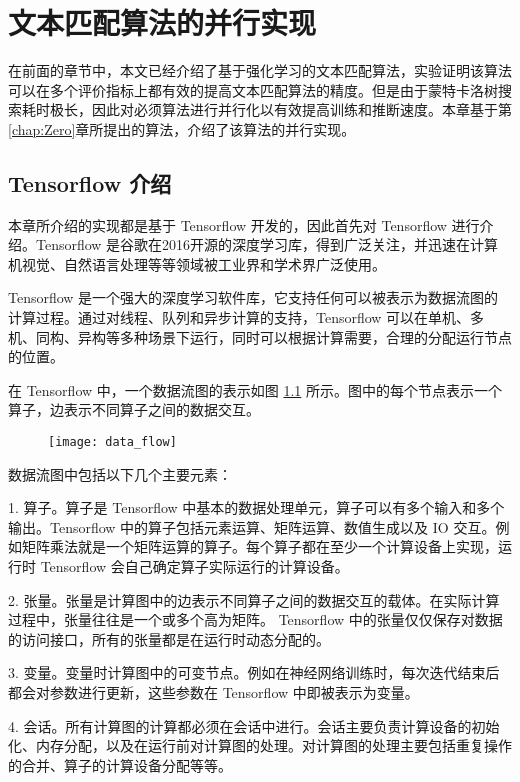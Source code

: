 \chapter{文本匹配算法的并行实现}

在前面的章节中，本文已经介绍了基于强化学习的文本匹配算法，实验证明该算法可以在多个评价指标上都有效的提高文本匹配算法的精度。但是由于蒙特卡洛树搜索耗时极长，因此对必须算法进行并行化以有效提高训练和推断速度。本章基于第\ref{chap:Zero}章所提出的算法，介绍了该算法的并行实现。

\section{Tensorflow 介绍}
\label{sec:intro2tf}
本章所介绍的实现都是基于 Tensorflow\cite{Abadi2016TensorFlowAS} 开发的，因此首先对 Tensorflow 进行介绍。Tensorflow 是谷歌在2016开源的深度学习库，得到广泛关注，并迅速在计算机视觉、自然语言处理等等领域被工业界和学术界广泛使用。

Tensorflow 是一个强大的深度学习软件库，它支持任何可以被表示为数据流图的计算过程。通过对线程、队列和异步计算的支持，Tensorflow 可以在单机、多机、同构、异构等多种场景下运行，同时可以根据计算需要，合理的分配运行节点的位置。

在 Tensorflow 中，一个数据流图的表示如图 \ref{fig:tensorflow_dep} 所示。图中的每个节点表示一个算子，边表示不同算子之间的数据交互。

\begin{figure}[!htbp]
    \centering
    \texttt{[image: data\_flow]}
    \label{fig:tensorflow_dep}
\end{figure}

数据流图中包括以下几个主要元素：

1. 算子。算子是 Tensorflow 中基本的数据处理单元，算子可以有多个输入和多个输出。Tensorflow 中的算子包括元素运算、矩阵运算、数值生成以及 IO 交互。例如矩阵乘法就是一个矩阵运算的算子。每个算子都在至少一个计算设备上实现，运行时 Tensorflow 会自己确定算子实际运行的计算设备。

2. 张量。张量是计算图中的边表示不同算子之间的数据交互的载体。在实际计算过程中，张量往往是一个或多个高为矩阵。 Tensorflow 中的张量仅仅保存对数据的访问接口，所有的张量都是在运行时动态分配的。

3. 变量。变量时计算图中的可变节点。例如在神经网络训练时，每次迭代结束后都会对参数进行更新，这些参数在 Tensorflow 中即被表示为变量。

4. 会话。所有计算图的计算都必须在会话中进行。会话主要负责计算设备的初始化、内存分配，以及在运行前对计算图的处理。对计算图的处理主要包括重复操作的合并、算子的计算设备分配等等。

